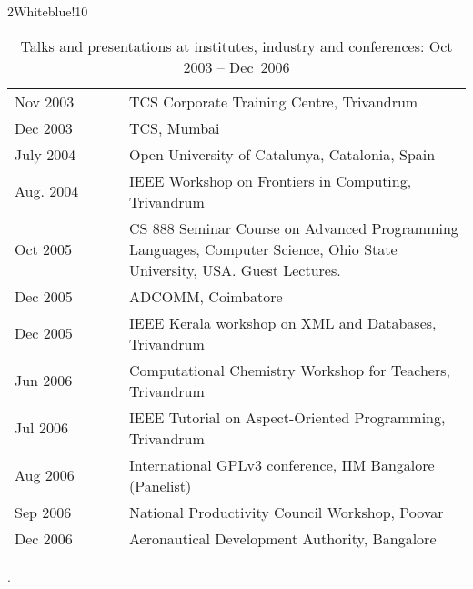 \documentclass[titlepage, %
11pt, 
]{article}
\begin{document}
\begin{table}
\rowcolors%
{2}{White}{blue!10}
\setlength\extrarowheight{4pt}
\begin{tabular}%
{|p{0.25\linewidth}|p{0.75\linewidth}|}
\hline
\multicolumn{1}{|m{0.25\linewidth}|}{\centering {\bf Year}}&
\multicolumn{1}{m{0.75\linewidth}|}{\centering {\bf Event, Location}}\\
\hline
Nov  2003 & TCS Corporate Training Centre, Trivandrum\\
Dec  2003 & TCS, Mumbai\\
\hline
July 2004 & Open University of Catalunya, Catalonia, Spain\\
Aug. 2004 & IEEE Workshop on Frontiers in Computing, Trivandrum\\
\hline
Oct  2005 & CS 888 Seminar Course on Advanced Programming Languages, Computer Science, Ohio State University, USA.  Guest Lectures.\\
Dec  2005 & ADCOMM, Coimbatore\\
Dec  2005 & IEEE Kerala workshop on XML and Databases, Trivandrum\\
Jun  2006 & Computational Chemistry Workshop for Teachers, Trivandrum\\
Jul  2006 & IEEE Tutorial on Aspect-Oriented Programming, Trivandrum\\
Aug  2006 & International GPLv3 conference, IIM Bangalore (Panelist)\\
Sep  2006 & National Productivity Council Workshop, Poovar\\
Dec  2006 & Aeronautical Development Authority, Bangalore\\
\hline
\end{tabular}
\caption{Talks and presentations at institutes, industry and conferences: Oct 2003 --  Dec~2006\label{tbl:talks-1}}.
\end{table}
\end{document}
